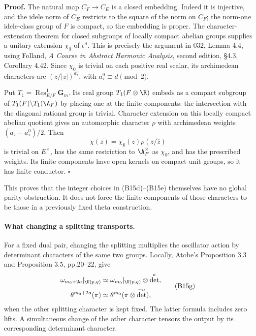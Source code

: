\documentclass[11pt]{article}
\theoremstyle{definition}\newtheorem{definition}[theorem]{Definition}\newtheorem{remark}[theorem]{Remark}
\begin{document}
\textbf{Proof.}
The natural map $C_F\to C_E$ is a closed embedding. Indeed it is injective, and the idele norm of $C_E$ restricts to the square of the norm on $C_F$; the norm-one idele-class group of $F$ is compact, so the embedding is proper. The character-extension theorem for closed subgroups of locally compact abelian groups supplies a unitary extension $\chi_0$ of $\epsilon^d$. This is precisely the argument in 032, Lemma 4.4, using Folland, \emph{A Course in Abstract Harmonic Analysis}, second edition, \S4.3, Corollary 4.42. Since $\chi_0$ is trivial on each positive real scalar, its archimedean characters are $(z/|z|)^{a^0_\tau}$, with $a^0_\tau\equiv d\pmod2$.

Put $T_1=\operatorname{Res}^{1}_{E/F}\mathbf G_m$. Its real group $T_1(F\otimes\R)$ embeds as a compact subgroup of $T_1(F)\backslash T_1(\A_F)$ by placing one at the finite components: the intersection with the diagonal rational group is trivial. Character extension on this locally compact abelian quotient gives an automorphic character $\rho$ with archimedean weights $(a_\tau-a^0_\tau)/2$. Then
\[
 \chi(z)=\chi_0(z)\rho(z/\overline z)
\]
is trivial on $E^\times$, has the same restriction to $\A_F^\times$ as $\chi_0$, and has the prescribed weights. Its finite components have open kernels on compact unit groups, so it has finite conductor. \hfill$\square$

This proves that the integer choices in (B15d)--(B15e) themselves have no global parity obstruction. It does not force the finite components of those characters to be those in a previously fixed theta construction.

\paragraph{What changing a splitting transports.}
For a fixed dual pair, changing the splitting multiplies the oscillator action by determinant characters of the same two groups. Locally, Atobe's Proposition 3.3 and Proposition 3.5, pp.20--22, give
\begin{equation}
\begin{aligned}
 \omega_{m_0+2a}|_{\U(p,q)}
       &\simeq\omega_{m_0}|_{\U(p,q)}\otimes\det^a,\\
 \theta^{m_0+2a}(\pi)
       &\simeq\theta^{m_0}(\pi\otimes\det^{-a}),
\end{aligned}
 \tag{B15g}
\end{equation}
when the other splitting character is kept fixed. The latter formula includes zero lifts. A simultaneous change of the other character tensors the output by its corresponding determinant character.
\end{document}

